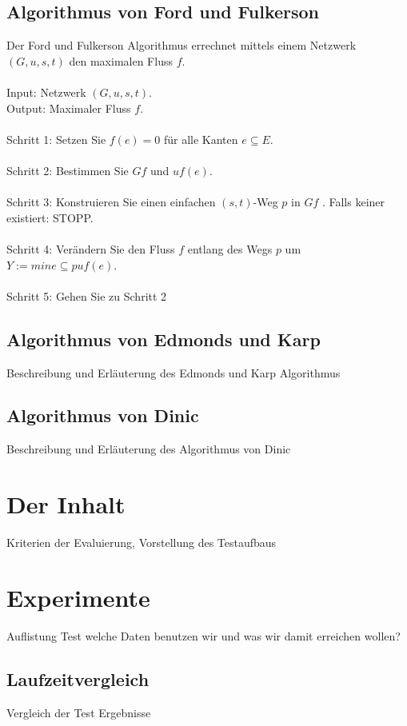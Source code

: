 \documentclass[a4paper]{llncs}
\begin{document}
\subsection{Algorithmus von Ford und Fulkerson}
Der Ford und Fulkerson Algorithmus errechnet mittels einem Netzwerk $(G,u,s,t)$ den maximalen Fluss $f$.\\ \\Input: Netzwerk $(G, u, s, t)$.\\Output: Maximaler Fluss $f$.\\ \\
Schritt 1: Setzen Sie $f(e) = 0$ für alle Kanten $e \subseteq E$.\\ \\Schritt 2: Bestimmen Sie $Gf$ und $uf (e)$.\\ \\Schritt 3: Konstruieren Sie einen einfachen $(s, t)$-Weg $p$ in $Gf$ . Falls keiner existiert:
STOPP.\\ \\Schritt 4: Verändern Sie den Fluss $f$ entlang des Wegs $p$ um $Y := mine \subseteq p uf (e)$.\\ \\Schritt 5: Gehen Sie zu Schritt 2


\subsection{Algorithmus von Edmonds und Karp}
Beschreibung und Erläuterung des Edmonds und Karp Algorithmus

\subsection{Algorithmus von Dinic}
Beschreibung und Erläuterung des Algorithmus von Dinic


\section{Der Inhalt}
\label{Inhalt}
Kriterien der Evaluierung, Vorstellung des Testaufbaus
\section{Experimente}
\label{Experimente}
Auflistung Test welche Daten benutzen wir und was wir damit erreichen wollen?
\subsection{Laufzeitvergleich}
Vergleich der Test Ergebnisse
\end{document}

